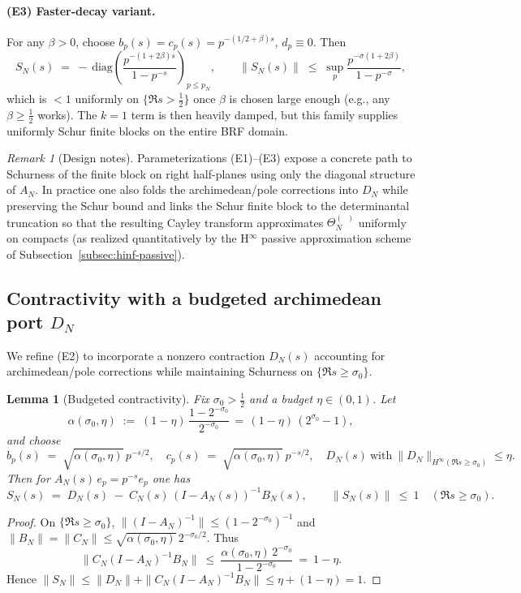 \documentclass[11pt]{article}
\newtheorem{lemma}[theorem]{Lemma}
\theoremstyle{definition}
\theoremstyle{remark}
\newtheorem{remark}[theorem]{Remark}
\DeclareMathOperator{\dettwo}{det_2}
\begin{document}
\paragraph{(E3) Faster-decay variant.}
For any $\beta>0$, choose $b_p(s)=c_p(s)=p^{-(1/2+\beta)s}$, $d_p\equiv 0$. Then
\[
 S_N(s)\;=\;-\,\mathrm{diag}\!\left(\frac{p^{-(1+2\beta)s}}{1-p^{-s}}\right)_{p\le p_N},\qquad \|S_N(s)\|\;\le\;\sup_p\frac{p^{-\sigma(1+2\beta)}}{1-p^{-\sigma}},
\]
which is $<1$ uniformly on $\{\Re s>\tfrac12\}$ once $\beta$ is chosen large enough (e.g., any $\beta\ge \tfrac12$ works). The $k=1$ term is then heavily damped, but this family supplies uniformly Schur finite blocks on the entire BRF domain.

\begin{remark}[Design notes]
Parameterizations (E1)–(E3) expose a concrete path to Schurness of the finite block on right half-planes using only the diagonal structure of $A_N$. In practice one also folds the archimedean/pole corrections into $D_N$ while preserving the Schur bound and links the Schur finite block to the determinantal truncation so that the resulting Cayley transform approximates $\Theta_N^{(\dettwo)}$ uniformly on compacts (as realized quantitatively by the H$^\infty$ passive approximation scheme of Subsection~\ref{subsec:hinf-passive}).
\end{remark}

\subsection{Contractivity with a budgeted archimedean port $D_N$}\label{subsec:DN-budget}
We refine (E2) to incorporate a nonzero contraction $D_N(s)$ accounting for archimedean/pole corrections while maintaining Schurness on $\{\Re s\ge \sigma_0\}$.

\begin{lemma}[Budgeted contractivity]\label{lem:budget}
Fix $\sigma_0>\tfrac12$ and a budget $\eta\in(0,1)$. Let
\[
 \alpha(\sigma_0,\eta)\;:=\;(1-\eta)\,\frac{1-2^{-\sigma_0}}{2^{-\sigma_0}}\,=\,(1-\eta)\,(2^{\sigma_0}-1),
\]
and choose
\[
 b_p(s)\;=\;\sqrt{\alpha(\sigma_0,\eta)}\,p^{-s/2},\quad c_p(s)\;=\;\sqrt{\alpha(\sigma_0,\eta)}\,p^{-s/2},\quad D_N(s)\ \text{with}\ \|D_N\|_{H^\infty(\Re s\ge \sigma_0)}\le \eta.
\]
Then for $A_N(s)\,e_p=p^{-s}e_p$ one has
\[
 S_N(s)\;=\;D_N(s)\; -\; C_N(s)\,(I-A_N(s))^{-1}B_N(s),\qquad \|S_N(s)\|\ \le\ 1\quad (\Re s\ge \sigma_0).
\]
\end{lemma}
\begin{proof}
On $\{\Re s\ge \sigma_0\}$, $\|(I-A_N)^{-1}\|\le (1-2^{-\sigma_0})^{-1}$ and $\|B_N\|=\|C_N\|\le \sqrt{\alpha(\sigma_0,\eta)}\,2^{-\sigma_0/2}$. Thus
\[
 \|C_N(I-A_N)^{-1}B_N\|\ \le\ \frac{\alpha(\sigma_0,\eta)\,2^{-\sigma_0}}{1-2^{-\sigma_0}}\ =\ 1-\eta.
\]
Hence $\|S_N\|\le \|D_N\|+\|C_N(I-A_N)^{-1}B_N\|\le \eta+(1-\eta)=1$.
\end{proof}
\end{document}
